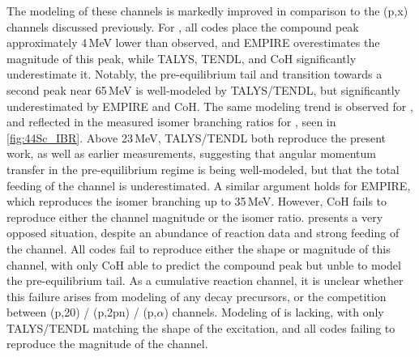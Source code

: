 The modeling of these channels is markedly improved  in comparison to the (p,x) channels discussed previously.
For , 
all  codes place the compound peak approximately 4\,MeV lower than observed, and EMPIRE overestimates the magnitude of this peak, while TALYS, TENDL, and CoH significantly underestimate it.
Notably, the pre-equilibrium tail and transition towards a second peak near 65\,MeV is well-modeled by TALYS/TENDL, but significantly underestimated by EMPIRE and CoH.
The same modeling trend is observed for , 
and reflected in the measured isomer branching ratios for , seen in \autoref{fig:44Sc_IBR}.
Above 23\,MeV, TALYS/TENDL both reproduce the present work, as well as earlier measurements, suggesting that angular momentum transfer in the pre-equilibrium regime is being well-modeled, but that the total feeding of the  channel is  underestimated. 
A similar argument holds for EMPIRE, which reproduces the isomer branching  up to 35\,MeV.
However, CoH fails to reproduce either the channel magnitude or the isomer ratio.
 presents a very opposed situation, despite an abundance of reaction data and strong feeding of the channel.
All codes fail to reproduce either the shape or magnitude of this channel, with only CoH able to predict the compound peak but unble to model the pre-equilibrium tail.
As a cumulative reaction channel, it is unclear whether this failure arises from modeling of any  decay precursors, or the competition between  (p,20) / (p,2pn) / (p,$\alpha$) channels. 
Modeling of  is lacking, with only TALYS/TENDL matching the shape of the excitation, and all codes failing to reproduce the magnitude of the channel.




